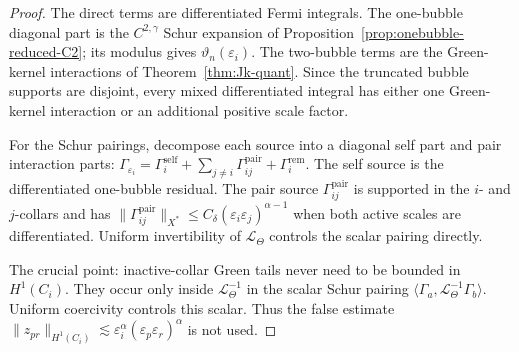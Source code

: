 \documentclass[11pt,reqno,a4paper]{amsart}
\numberwithin{equation}{section}
\theoremstyle{plain}
\theoremstyle{remark}
\theoremstyle{plain}
\begin{document}
\begin{proof}
The direct terms are differentiated Fermi integrals.  The one-bubble diagonal
part is the $C^{2,\gamma}$ Schur expansion of
Proposition~\ref{prop:onebubble-reduced-C2}; its modulus gives
$\vartheta_n(\varepsilon_i)$.  The two-bubble terms are the Green-kernel
interactions of Theorem~\ref{thm:Jk-quant}.  Since the truncated bubble
supports are disjoint, every mixed differentiated integral has either one
Green-kernel interaction or an additional positive scale factor.

For the Schur pairings, decompose each source into a diagonal self part and
pair interaction parts:
$\Gamma_{\varepsilon_i}=\Gamma_i^{\mathrm{self}}
+\sum_{j\ne i}\Gamma_{ij}^{\mathrm{pair}}+\Gamma_i^{\mathrm{rem}}$.
The self source is the differentiated one-bubble residual.  The pair source
$\Gamma_{ij}^{\mathrm{pair}}$ is supported in the $i$- and $j$-collars and
has $\|\Gamma_{ij}^{\mathrm{pair}}\|_{X^\ast}
\le C_\delta(\varepsilon_i\varepsilon_j)^{\alpha-1}$
when both active scales are differentiated.  Uniform invertibility of
$\mathcal L_\Theta$ controls the scalar pairing directly.

The crucial point: inactive-collar Green tails never need to be bounded in
$H^1(C_i)$.  They occur only inside $\mathcal L_\Theta^{-1}$ in the scalar
Schur pairing $\langle\Gamma_a,\mathcal L_\Theta^{-1}\Gamma_b\rangle$.
Uniform coercivity controls this scalar.  Thus the false estimate
$\|z_{pr}\|_{H^1(C_i)}\lesssim\varepsilon_i^\alpha(\varepsilon_p\varepsilon_r)^\alpha$
is not used.
\end{proof}
\end{document}
